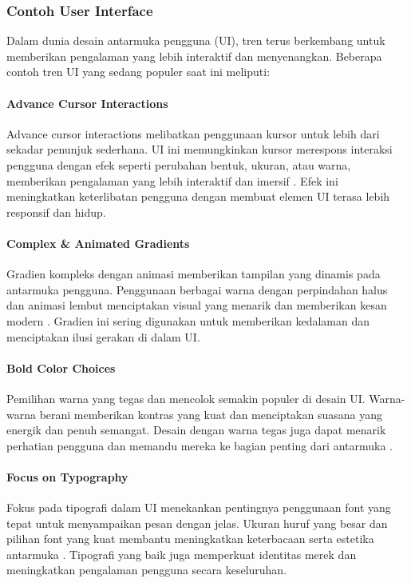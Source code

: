 \documentclass[12pt]{article}
\begin{document}
\subsubsection{Contoh User Interface}

Dalam dunia desain antarmuka pengguna (UI), tren terus berkembang untuk memberikan pengalaman yang lebih interaktif dan menyenangkan. Beberapa contoh tren UI yang sedang populer saat ini meliputi:

\paragraph{Advance Cursor Interactions}
Advance cursor interactions melibatkan penggunaan kursor untuk lebih dari sekadar penunjuk sederhana. UI ini memungkinkan kursor merespons interaksi pengguna dengan efek seperti perubahan bentuk, ukuran, atau warna, memberikan pengalaman yang lebih interaktif dan imersif \cite{busche2020}. Efek ini meningkatkan keterlibatan pengguna dengan membuat elemen UI terasa lebih responsif dan hidup.

\paragraph{Complex \& Animated Gradients}
Gradien kompleks dengan animasi memberikan tampilan yang dinamis pada antarmuka pengguna. Penggunaan berbagai warna dengan perpindahan halus dan animasi lembut menciptakan visual yang menarik dan memberikan kesan modern \cite{sutton2020}. Gradien ini sering digunakan untuk memberikan kedalaman dan menciptakan ilusi gerakan di dalam UI.

\paragraph{Bold Color Choices}
Pemilihan warna yang tegas dan mencolok semakin populer di desain UI. Warna-warna berani memberikan kontras yang kuat dan menciptakan suasana yang energik dan penuh semangat. Desain dengan warna tegas juga dapat menarik perhatian pengguna dan memandu mereka ke bagian penting dari antarmuka \cite{coleman2021}.

\paragraph{Focus on Typography}
Fokus pada tipografi dalam UI menekankan pentingnya penggunaan font yang tepat untuk menyampaikan pesan dengan jelas. Ukuran huruf yang besar dan pilihan font yang kuat membantu meningkatkan keterbacaan serta estetika antarmuka \cite{tschichold1995}. Tipografi yang baik juga memperkuat identitas merek dan meningkatkan pengalaman pengguna secara keseluruhan.
\end{document}
